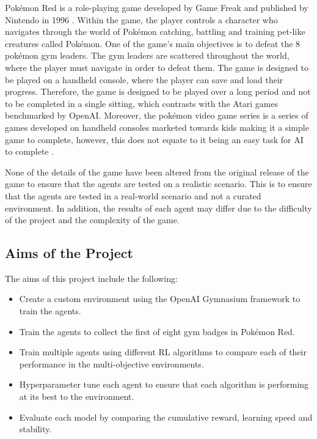 Pokémon Red is a role-playing game developed by Game Freak and published by Nintendo in 1996 \cite{HubZ_1998}. Within the game, the player controls a character who navigates through the world of Pokémon catching, battling and training pet-like creatures called Pokémon. One of the game's main objectives is to defeat the 8 pokémon gym leaders. The gym leaders are scattered throughout the world, where the player must navigate in order to defeat them. The game is designed to be played on a handheld console, where the player can save and load their progress. Therefore, the game is designed to be played over a long period and not to be completed in a single sitting, which contrasts with the Atari games benchmarked by OpenAI. Moreover, the pokémon video game series is a series of games developed on handheld consoles marketed towards kids making it a simple game to complete, however, this does not equate to it being an easy task for AI to complete \cite{HubZ_1998}. 

None of the details of the game have been altered from the original release of the game to ensure that the agents are tested on a realistic scenario. This is to ensure that the agents are tested in a real-world scenario and not a curated environment. In addition, the results of each agent may differ due to the difficulty of the project and the complexity of the game.  

\subsection{Aims of the Project}

The aims of this project include the following:

\begin{itemize}
    \item Create a custom environment using the OpenAI Gymnasium framework to train the agents.
    \item Train the agents to collect the first of eight gym badges in Pokémon Red.
    \item Train multiple agents using different RL algorithms to compare each of their performance in the multi-objective environments.
    \item Hyperparameter tune each agent to ensure that each algorithm is performing at its best to the environment.
    \item Evaluate each model by comparing the cumulative reward, learning speed and stability.

\end{itemize}

